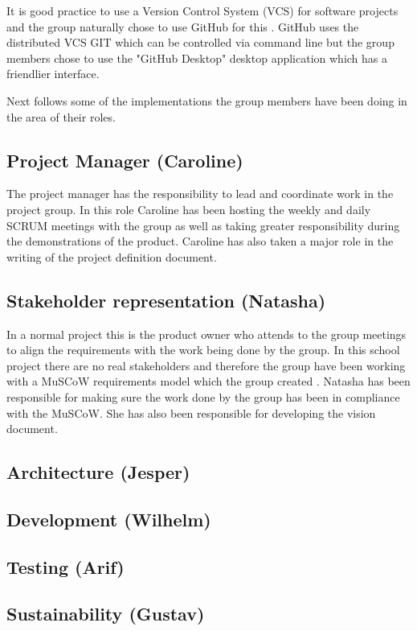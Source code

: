 It is good practice to use a Version Control System (VCS) for software projects and the group naturally chose to use GitHub for this \cite{ian_sommerville_software_nodate}. GitHub uses the distributed VCS GIT which can be controlled via command line but the group members chose to use the "GitHub Desktop" desktop application which has a friendlier interface. 

Next follows some of the implementations the group members have been doing in the area of their roles. 

\subsection{Project Manager (Caroline)}
The project manager has the responsibility to lead and coordinate work in the project group. In this role Caroline has been hosting the weekly and daily SCRUM meetings with the group as well as taking greater responsibility during the demonstrations of the product. Caroline has also taken a major role in the writing of the project definition document. 

\subsection{Stakeholder representation (Natasha)}
In a normal project this is the product owner who attends to the group meetings to align the requirements with the work being done by the group. In this school project there are no real stakeholders and therefore the group have been working with a MuSCoW requirements model which the group created \cite{eklund_arbeta_2010}. Natasha has been responsible for making sure the work done by the group has been in compliance with the MuSCoW. She has also been responsible for developing the vision document. 

\subsection{Architecture (Jesper)}


\subsection{Development (Wilhelm)}


\subsection{Testing (Arif)}


\subsection{Sustainability (Gustav)}

